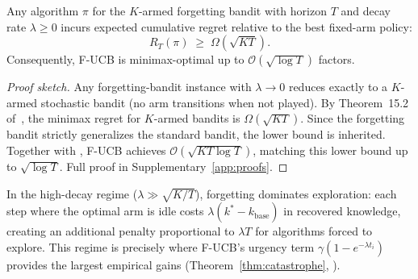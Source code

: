 \begin{theorem}
\label{thm:lower_bound}
Any algorithm $\pi$ for the $K$-armed forgetting bandit with horizon $T$ and decay rate $\lambda \geq 0$ incurs expected cumulative regret relative to the best fixed-arm policy:
\begin{equation}
    R_T(\pi) \;\geq\; \Omega\!\left(\sqrt{KT}\right).
    \label{eq:lower_bound}
\end{equation}
Consequently, F-UCB is minimax-optimal up to $\mathcal{O}(\sqrt{\log T})$ factors.
\end{theorem}

\begin{proof}[Proof sketch]
Any forgetting-bandit instance with $\lambda \to 0$ reduces exactly to a $K$-armed stochastic bandit (no arm transitions when not played). By Theorem~15.2 of~\citet{lattimore2020bandit}, the minimax regret for $K$-armed bandits is $\Omega(\sqrt{KT})$. Since the forgetting bandit strictly generalizes the standard bandit, the lower bound is inherited.
Together with , F-UCB achieves $\mathcal{O}(\sqrt{KT\log T})$, matching this lower bound up to $\sqrt{\log T}$. Full proof in Supplementary~\ref{app:proofs}.
\end{proof}

\begin{remark}
In the high-decay regime ($\lambda \gg \sqrt{K/T}$), forgetting dominates exploration: each step where the optimal arm is idle costs $\lambda(k^* - k_{\mathrm{base}})$ in recovered knowledge, creating an additional penalty proportional to $\lambda T$ for algorithms forced to explore. This regime is precisely where F-UCB's urgency term $\gamma(1-e^{-\lambda t_i})$ provides the largest empirical gains (Theorem~\ref{thm:catastrophe}, ).
\end{remark}
